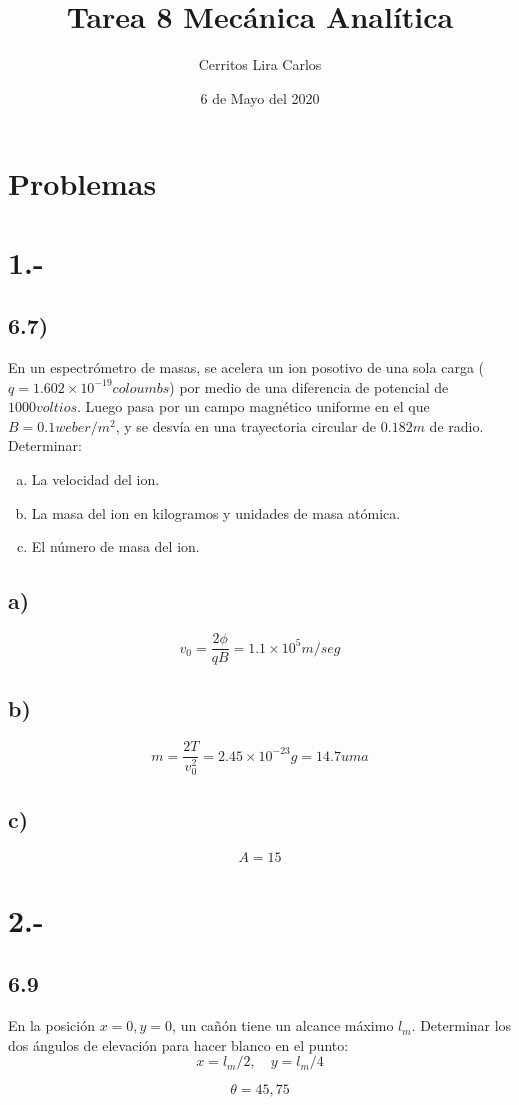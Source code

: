 \documentclass{article}
\title{Tarea 8 Mecánica Analítica}
\author{Cerritos Lira Carlos}
\date{6 de Mayo del 2020}
\begin{document}
\maketitle
\section*{Problemas}
\section*{1.-}
\subsection*{6.7)}
En un espectrómetro de masas, se acelera un ion posotivo de una sola carga 
($q=1.602 \times 10^{-19} coloumbs$) por medio de una diferencia de potencial de 
$1000 voltios$. Luego pasa por un campo magnético uniforme en el que $B=0.1weber/m^2$,
y se desvía en una trayectoria circular de $0.182m$ de radio. Determinar:
\begin{enumerate}[a)]
    \item La velocidad del ion.
    \item La masa del ion en kilogramos y unidades de masa atómica.
    \item El número de masa del ion.
\end{enumerate}
\begin{tcolorbox}[breakable]
    \subsection*{a)}
    \[v_0 = \frac{2\phi}{qB} = 1.1 \times 10^5 m/seg \]
    \subsection*{b)}
    \[ m = \frac{2T}{v_0^2} = 2.45 \times 10^{-23}g = 14.7uma \]
    \subsection*{c)}
    \[ A = 15 \]
\end{tcolorbox}

\section*{2.-}
\subsection*{6.9}
En la posición $x=0, y=0$, un cañón tiene un alcance máximo $l_m$. Determinar los dos 
ángulos de elevación para hacer blanco en el punto:
\[ x = l_m/2, \quad y=l_m/4 \]
\begin{tcolorbox}[breakable]
    \[ \theta = 45, 75 \]
\end{tcolorbox}
\end{document}
